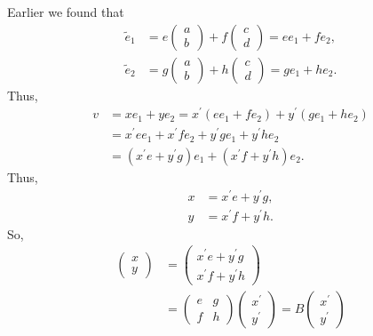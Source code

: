 \documentclass{report}
\begin{document}
\begin{itemize}
            Earlier we found that
            \begin{align*}
                \tilde{e}_{1} &= e\begin{pmatrix} a \\b \end{pmatrix} + f \begin{pmatrix} c \\d \end{pmatrix} = ee_{1} + fe_{2}, \\
                \tilde{e}_{2} &= g\begin{pmatrix} a \\b \end{pmatrix} + h \begin{pmatrix} c \\d \end{pmatrix} = ge_{1} + he_{2}
            .\end{align*}
            Thus,
            \begin{align*}
                v &= xe_{1} + ye_{2} = x^{\prime} (ee_{1} + fe_{2}) + y^{\prime}(ge_{1} + he_{2}) \\
                &=x^{\prime} ee_{1} + x^{\prime}fe_{2} + y^{\prime}ge_{1} + y^{\prime}he_{2} \\
                &= (x^{\prime} e + y^{\prime} g )e_{1} + (x^{\prime} f  + y^{\prime} h)e_{2}
            .\end{align*}
            Thus,
            \begin{align*}
                x &= x^{\prime}e + y^{\prime} g, \\
                y &= x^{\prime} f + y^{\prime} h
            .\end{align*}
            So,
            \begin{align*}
                \begin{pmatrix} x \\y  \end{pmatrix} &= \begin{pmatrix} x^{\prime}e + y^{\prime} g \\ x^{\prime} f + y^{\prime} h \end{pmatrix} \\
                                                     &= \begin{pmatrix} e & g \\ f & h \end{pmatrix}\begin{pmatrix} x^{\prime} \\ y^{\prime} \end{pmatrix} = B\begin{pmatrix} x^{\prime} \\ y^{\prime} \end{pmatrix}

\end{align*}
\end{itemize}
\end{document}
